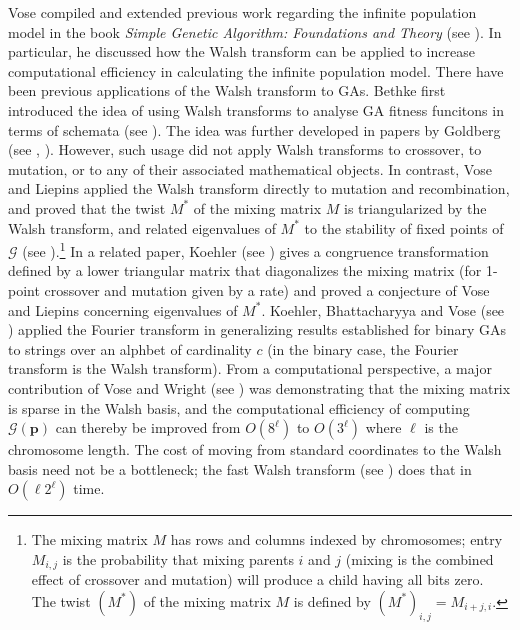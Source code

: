 
Vose compiled and extended previous work regarding the infinite population model in the book 
\textit{Simple Genetic Algorithm: Foundations and Theory} (see \cite{Vose1999}). 
In particular, he discussed how the Walsh transform can be applied to increase 
computational efficiency in calculating the infinite population model. 
There have been previous applications of the Walsh transform to GAs. Bethke first introduced the 
idea of using Walsh transforms to analyse GA fitness funcitons in terms of schemata (see \cite{Bethke1981}). 
The idea was further developed in papers by Goldberg (see \cite{Goldberg1989a}, \cite{Goldberg1989b}). 
However, such usage did not apply Walsh transforms  to crossover, to mutation, or to any of their 
associated mathematical objects. In contrast, Vose and Liepins applied the Walsh transform directly to mutation and recombination, and proved that the 
twist $M^\ast$ of the mixing matrix $M$ is triangularized by the Walsh transform, and 
related eigenvalues of $M^\ast$ to the stability of fixed points of $\mathcal{G}$ (see \cite{VoseLiepins1991}).\footnote{The mixing 
matrix $M$ has rows and columns indexed by chromosomes; entry $M_{i,j}$ is the probability 
that mixing parents $i$ and $j$ (mixing is the combined effect of crossover and mutation) will produce a 
child having all bits zero. The twist $(M^\ast)$ of the mixing matrix $M$ is defined by $(M^\ast)_{i,j} = M_{i+j, i}$.} 
In a related paper, Koehler (see \cite{Koehler1994}) gives a congruence 
transformation defined by a lower triangular matrix that diagonalizes the mixing matrix (for 1-point crossover and mutation 
given by a rate) and proved a conjecture of Vose and Liepins concerning eigenvalues of $M^\ast$. Koehler, Bhattacharyya 
and Vose (see \cite{KoehlerBhatta1997}) applied the Fourier transform in generalizing results established 
for binary GAs to 
strings over an alphbet of cardinality $c$ (in the binary case, the Fourier transform is the Walsh transform). 
From a computational perspective, a major contribution of Vose and Wright (see \cite{VoseWright1998}) was demonstrating that 
the mixing matrix is sparse in the Walsh basis, and the computational efficiency of 
computing $\mathcal{G}(\bm{p})$ can thereby be improved from 
$O(8^\ell)$ to $O(3^\ell)$ where $\ell$ is the chromosome length. The cost of moving from standard coordinates to the Walsh basis need not be a bottleneck; 
the fast Walsh transform (see \cite{Shanks1969}) does that in $O(\ell 2^\ell)$ time.

